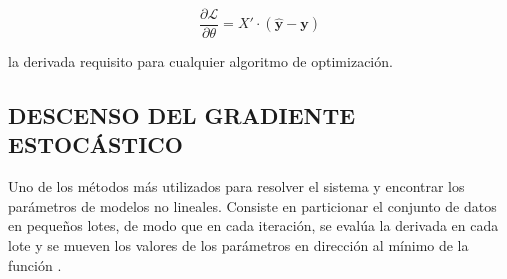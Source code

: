         \begin{equation}
            \frac{\partial\mathcal{L}}{\partial \theta} = X' \cdot (\mathbf{\hat{y}} - \mathbf{y})
        \end{equation}
        
        \noindent la derivada requisito para cualquier algoritmo de optimización.
        
    \subsection{DESCENSO DEL GRADIENTE ESTOCÁSTICO}
        Uno de los métodos más utilizados para resolver el sistema y encontrar los parámetros de modelos no lineales. Consiste en particionar el conjunto de datos en pequeños lotes, de modo que en cada iteración, se evalúa la derivada en cada lote y se mueven los valores de los parámetros en dirección al mínimo de la función \citep{hastie01statisticallearning}.
        
